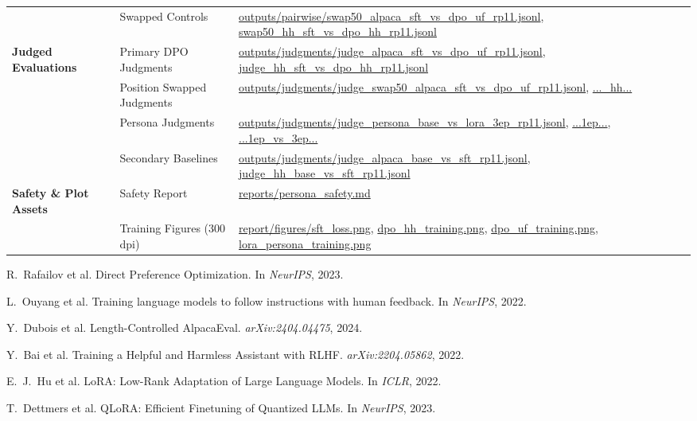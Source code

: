 \documentclass[11pt,a4paper]{article}
\begin{document}
\begin{table}[t]
\begin{tabularx}{\textwidth}{llX}
& Swapped Controls & \url{outputs/pairwise/swap50_alpaca_sft_vs_dpo_uf_rp11.jsonl}, \url{swap50_hh_sft_vs_dpo_hh_rp11.jsonl} \\
\textbf{Judged Evaluations} & Primary DPO Judgments & \url{outputs/judgments/judge_alpaca_sft_vs_dpo_uf_rp11.jsonl}, \url{judge_hh_sft_vs_dpo_hh_rp11.jsonl} \\
& Position Swapped Judgments & \url{outputs/judgments/judge_swap50_alpaca_sft_vs_dpo_uf_rp11.jsonl}, \url{..._hh...} \\
& Persona Judgments & \url{outputs/judgments/judge_persona_base_vs_lora_3ep_rp11.jsonl}, \url{...1ep...}, \url{...1ep_vs_3ep...} \\
& Secondary Baselines & \url{outputs/judgments/judge_alpaca_base_vs_sft_rp11.jsonl}, \url{judge_hh_base_vs_sft_rp11.jsonl} \\
\textbf{Safety \& Plot Assets} & Safety Report & \url{reports/persona_safety.md} \\
& Training Figures (300 dpi) & \url{report/figures/sft_loss.png}, \url{dpo_hh_training.png}, \url{dpo_uf_training.png}, \url{lora_persona_training.png} \\
\bottomrule
\end{tabularx}
\end{table}

\begin{thebibliography}{9}
R.~Rafailov et al.
\newblock Direct Preference Optimization.
\newblock In \emph{NeurIPS}, 2023.

L.~Ouyang et al.
\newblock Training language models to follow instructions with human feedback.
\newblock In \emph{NeurIPS}, 2022.

Y.~Dubois et al.
\newblock Length-Controlled AlpacaEval.
\newblock \emph{arXiv:2404.04475}, 2024.

Y.~Bai et al.
\newblock Training a Helpful and Harmless Assistant with RLHF.
\newblock \emph{arXiv:2204.05862}, 2022.

E.~J.~Hu et al.
\newblock LoRA: Low-Rank Adaptation of Large Language Models.
\newblock In \emph{ICLR}, 2022.

T.~Dettmers et al.
\newblock QLoRA: Efficient Finetuning of Quantized LLMs.
\newblock In \emph{NeurIPS}, 2023.
\end{thebibliography}
\end{document}
